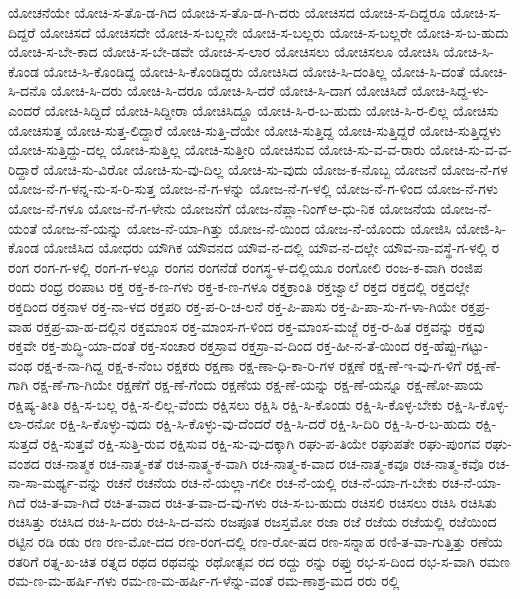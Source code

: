 {ಯೋಚನೆಯೇ
ಯೋಚಿ-ಸ-ತೊ-ಡ-ಗಿದ
ಯೋಚಿ-ಸ-ತೊ-ಡ-ಗಿ-ದರು
ಯೋಚಿಸದ
ಯೋಚಿ-ಸ-ದಿದ್ದರೂ
ಯೋಚಿ-ಸ-ದಿದ್ದರೆ
ಯೋಚಿಸದೆ
ಯೋಚಿಸದೇ
ಯೋಚಿ-ಸ-ಬಲ್ಲನೇ
ಯೋಚಿ-ಸ-ಬಲ್ಲರು
ಯೋಚಿ-ಸ-ಬಲ್ಲರೇ
ಯೋಚಿ-ಸ-ಬ-ಹುದು
ಯೋಚಿ-ಸ-ಬೇ-ಕಾದ
ಯೋಚಿ-ಸ-ಬೇ-ಡವೇ
ಯೋಚಿ-ಸ-ಲಾರ
ಯೋಚಿಸಲು
ಯೋಚಿಸಲೂ
ಯೋಚಿಸಿ
ಯೋಚಿ-ಸಿ-ಕೊಂಡ
ಯೋಚಿ-ಸಿ-ಕೊಂಡಿದ್ದ
ಯೋಚಿ-ಸಿ-ಕೊಂಡಿದ್ದರು
ಯೋಚಿಸಿದ
ಯೋಚಿ-ಸಿ-ದಂತಿಲ್ಲ
ಯೋಚಿ-ಸಿ-ದಂತೆ
ಯೋಚಿ-ಸಿ-ದನೊ
ಯೋಚಿ-ಸಿ-ದರು
ಯೋಚಿ-ಸಿ-ದರೂ
ಯೋಚಿ-ಸಿ-ದರೆ
ಯೋಚಿ-ಸಿ-ದಾಗ
ಯೋಚಿಸಿದೆ
ಯೋಚಿ-ಸಿದ್ದ-ಳು-ಎಂದರೆ
ಯೋಚಿ-ಸಿದ್ದಿದೆ
ಯೋಚಿ-ಸಿದ್ದೀರಾ
ಯೋಚಿಸಿದ್ದೂ
ಯೋಚಿ-ಸಿ-ರ-ಬ-ಹುದು
ಯೋಚಿ-ಸಿ-ರ-ಲಿಲ್ಲ
ಯೋಚಿಸು
ಯೋಚಿಸುತ್ತ
ಯೋಚಿ-ಸುತ್ತ-ಲಿದ್ದಾರೆ
ಯೋಚಿ-ಸುತ್ತಿ-ದೆಯೇ
ಯೋಚಿ-ಸುತ್ತಿದ್ದ
ಯೋಚಿ-ಸುತ್ತಿದ್ದರೆ
ಯೋಚಿ-ಸುತ್ತಿದ್ದಳು
ಯೋಚಿ-ಸುತ್ತಿದ್ದು-ದಲ್ಲ
ಯೋಚಿ-ಸುತ್ತಿಲ್ಲ
ಯೋಚಿ-ಸುತ್ತೀರಿ
ಯೋಚಿಸುವ
ಯೋಚಿ-ಸು-ವ-ವ-ರಾರು
ಯೋಚಿ-ಸು-ವ-ವ-ರಿದ್ದಾರೆ
ಯೋಚಿ-ಸು-ವಿರೋ
ಯೋಚಿ-ಸು-ವು-ದಿಲ್ಲ
ಯೋಚಿ-ಸು-ವುದು
ಯೋಜ-ಕ-ನೊಬ್ಬ
ಯೋಜನೆ
ಯೋಜ-ನೆ-ಗಳ
ಯೋಜ-ನೆ-ಗ-ಳನ್ನ-ನು-ಸ-ರಿ-ಸುತ್ತ
ಯೋಜ-ನೆ-ಗ-ಳನ್ನು
ಯೋಜ-ನೆ-ಗ-ಳಲ್ಲಿ
ಯೋಜ-ನೆ-ಗ-ಳಿಂದ
ಯೋಜ-ನೆ-ಗಳು
ಯೋಜ-ನೆ-ಗಳೂ
ಯೋಜ-ನೆ-ಗ-ಳೇನು
ಯೋಜನೆಗೆ
ಯೋಜ-ನೆಪ್ಲಾ-ನಿಂಗ್ಆ-ಧು-ನಿಕ
ಯೋಜನೆಯ
ಯೋಜ-ನೆ-ಯಂತೆ
ಯೋಜ-ನೆ-ಯನ್ನು
ಯೋಜ-ನೆ-ಯಾ-ಗಿತ್ತು
ಯೋಜ-ನೆ-ಯಿಂದ
ಯೋಜ-ನೆ-ಯೊಂದು
ಯೋಜಿಸಿ
ಯೋಜಿ-ಸಿ-ಕೊಂಡ
ಯೋಜಿಸಿದ
ಯೋಧರು
ಯೌಗಿಕ
ಯೌವನದ
ಯೌವ-ನ-ದಲ್ಲಿ
ಯೌವ-ನ-ದಲ್ಲೇ
ಯೌವ-ನಾ-ವಸ್ಥೆ-ಗ-ಳಲ್ಲಿ
ರ
ರಂಗ
ರಂಗ-ಗ-ಳಲ್ಲಿ
ರಂಗ-ಗ-ಳಲ್ಲೂ
ರಂಗನ
ರಂಗನೆಡೆ
ರಂಗಸ್ಥ-ಳ-ದಲ್ಲಿಯೂ
ರಂಗೋಲಿ
ರಂಜ-ಕ-ವಾಗಿ
ರಂಜಿಪ
ರಂದು
ರಂಧ್ರ
ರಂಪಾಟ
ರಕ್ತ
ರಕ್ತ-ಕ-ಣ-ಗಳು
ರಕ್ತ-ಕ-ಣ-ಗಳೂ
ರಕ್ತಕ್ರಾಂತಿ
ರಕ್ತಜ್ವಾಲೆ
ರಕ್ತದ
ರಕ್ತದಲ್ಲಿ
ರಕ್ತದಲ್ಲೇ
ರಕ್ತದಿಂದ
ರಕ್ತನಾಳ
ರಕ್ತ-ನಾ-ಳದ
ರಕ್ತಪರಿ
ರಕ್ತ-ಪ-ರಿ-ಚ-ಲನೆ
ರಕ್ತ-ಪಿ-ಪಾಸು
ರಕ್ತ-ಪಿ-ಪಾ-ಸು-ಗ-ಳಾ-ಗಿಯೇ
ರಕ್ತಪ್ರ-ವಾಹ
ರಕ್ತಪ್ರ-ವಾ-ಹ-ದಲ್ಲಿನ
ರಕ್ತಮಾಂಸ
ರಕ್ತ-ಮಾಂಸ-ಗ-ಳಿಂದ
ರಕ್ತ-ಮಾಂಸ-ಮಜ್ಜೆ
ರಕ್ತ-ರ-ಹಿತ
ರಕ್ತವನ್ನು
ರಕ್ತವು
ರಕ್ತವೇ
ರಕ್ತ-ಶುದ್ಧಿ-ಯಾ-ದಂತೆ
ರಕ್ತ-ಸಂಚಾರ
ರಕ್ತಸ್ರಾವ
ರಕ್ತಸ್ರಾ-ವ-ದಿಂದ
ರಕ್ತ-ಹೀ-ನ-ತೆ-ಯಿಂದ
ರಕ್ತ-ಹೆಪ್ಪು-ಗಟ್ಟು-ವಂಥ
ರಕ್ಷ-ಕ-ನಾ-ಗಿದ್ದ
ರಕ್ಷ-ಕ-ನೆಂಬ
ರಕ್ಷಕರು
ರಕ್ಷಣಾ
ರಕ್ಷ-ಣಾ-ಧಿ-ಕಾ-ರಿ-ಗಳ
ರಕ್ಷಣೆ
ರಕ್ಷ-ಣೆ-ಇ-ವು-ಗ-ಳಿಗೆ
ರಕ್ಷ-ಣೆ-ಗಾಗಿ
ರಕ್ಷ-ಣೆ-ಗಾ-ಗಿಯೇ
ರಕ್ಷಣೆಗೆ
ರಕ್ಷ-ಣೆ-ಗೆಂದು
ರಕ್ಷಣೆಯ
ರಕ್ಷ-ಣೆ-ಯನ್ನು
ರಕ್ಷ-ಣೆ-ಯನ್ನೂ
ರಕ್ಷ-ಣೋ-ಪಾಯ
ರಕ್ಷಿಷ್ಯ-ತೀತಿ
ರಕ್ಷಿ-ಸ-ಬಲ್ಲ
ರಕ್ಷಿ-ಸ-ಲಿಲ್ಲ-ವೆಂದು
ರಕ್ಷಿಸಲು
ರಕ್ಷಿಸಿ
ರಕ್ಷಿ-ಸಿ-ಕೊಂಡು
ರಕ್ಷಿ-ಸಿ-ಕೊಳ್ಳ-ಬೇಕು
ರಕ್ಷಿ-ಸಿ-ಕೊಳ್ಳ-ಲಾ-ರನೋ
ರಕ್ಷಿ-ಸಿ-ಕೊಳ್ಳು-ವುದು
ರಕ್ಷಿ-ಸಿ-ಕೊಳ್ಳು-ವು-ದೆಂದರೆ
ರಕ್ಷಿ-ಸಿ-ದರೆ
ರಕ್ಷಿ-ಸಿ-ದಿರಿ
ರಕ್ಷಿ-ಸಿ-ರ-ಬ-ಹುದು
ರಕ್ಷಿ-ಸುತ್ತದೆ
ರಕ್ಷಿ-ಸುತ್ತವೆ
ರಕ್ಷಿ-ಸುತ್ತಿ-ರುವ
ರಕ್ಷಿಸುವ
ರಕ್ಷಿ-ಸು-ವು-ದಕ್ಕಾಗಿ
ರಘು-ಪ-ತಿಯೇ
ರಘುಪತೇ
ರಘು-ಪುಂಗವ
ರಘು-ವಂಶದ
ರಚ-ನಾತ್ಮಕ
ರಚ-ನಾತ್ಮ-ಕತೆ
ರಚ-ನಾತ್ಮ-ಕ-ವಾಗಿ
ರಚ-ನಾತ್ಮ-ಕ-ವಾದ
ರಚ-ನಾತ್ಮ-ಕವೂ
ರಚ-ನಾತ್ಮ-ಕವೊ
ರಚ-ನಾ-ಸಾ-ಮರ್ಥ್ಯ-ವನ್ನು
ರಚನೆ
ರಚನೆಯ
ರಚ-ನೆ-ಯಲ್ಲಾ-ಗಲೀ
ರಚ-ನೆ-ಯಲ್ಲಿ
ರಚ-ನೆ-ಯಾ-ಗ-ಬೇಕು
ರಚ-ನೆ-ಯಾ-ಗಿದೆ
ರಚಿ-ತ-ವಾ-ಗಿದೆ
ರಚಿ-ತ-ವಾದ
ರಚಿ-ತ-ವಾ-ದ-ವು-ಗಳು
ರಚಿ-ಸ-ಬ-ಹುದು
ರಚಿಸಲಿ
ರಚಿಸಲು
ರಚಿಸಿ
ರಚಿಸಿತು
ರಚಿಸಿತ್ತು
ರಚಿಸಿದ
ರಚಿ-ಸಿ-ದರು
ರಚಿ-ಸಿ-ದ-ವನು
ರಜಪೂತ
ರಜಸ್ತಮೋ
ರಜಾ
ರಜೆ
ರಜೆಯ
ರಜೆಯಲ್ಲಿ
ರಜೆಯಿಂದ
ರಟ್ಟಿನ
ರಡಿ
ರಡು
ರಣ
ರಣ-ಮೋ-ದದ
ರಣ-ರಂಗ-ದಲ್ಲಿ
ರಣ-ರೋ-ಷದ
ರಣ-ಸನ್ನಾಹ
ರಣಿ-ತ-ವಾ-ಗುತ್ತಿತ್ತು
ರಣೆಯ
ರತರಿಗೆ
ರತ್ನ-ಖ-ಚಿತ
ರತ್ನದ
ರಥದ
ರಥವನ್ನು
ರಥೋತ್ಸವ
ರದ
ರದ್ದು
ರನ್ನು
ರಫ್ತು
ರಭ-ಸ-ದಿಂದ
ರಭ-ಸ-ವಾಗಿ
ರಮಣ
ರಮ-ಣ-ಮ-ಹರ್ಷಿ-ಗಳು
ರಮ-ಣ-ಮ-ಹರ್ಷಿ-ಗ-ಳೆನ್ನು-ವಂತೆ
ರಮ-ಣಾಶ್ರ-ಮದ
ರರು
ರಲ್ಲಿ
}
